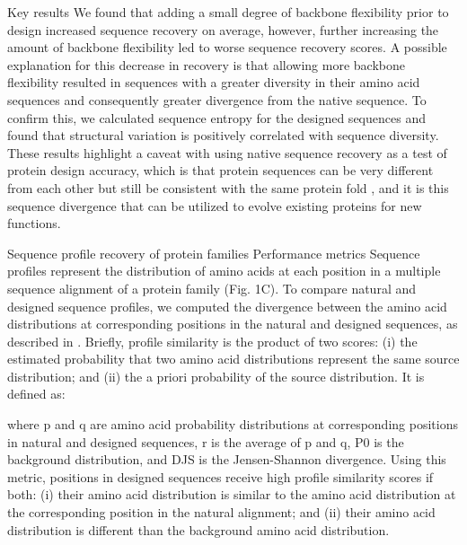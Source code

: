 Key results
We found that adding a small degree of backbone flexibility prior to design increased sequence recovery on average, however, further increasing the amount of backbone flexibility led to worse sequence recovery scores. A possible explanation for this decrease in recovery is that allowing more backbone flexibility resulted in sequences with a greater diversity in their amino acid sequences and consequently greater divergence from the native sequence. To confirm this, we calculated sequence entropy for the designed sequences and found that structural variation is positively correlated with sequence diversity. These results highlight a caveat with using native sequence recovery as a test of protein design accuracy, which is that protein sequences can be very different from each other but still be consistent with the same protein fold \cite{yona_within_2002}, and it is this sequence divergence that can be utilized to evolve existing proteins for new functions.

Sequence profile recovery of protein families
Performance metrics
Sequence profiles represent the distribution of amino acids at each position in a multiple sequence alignment of a protein family (Fig. 1C). To compare natural and designed sequence profiles, we computed the divergence between the amino acid distributions at corresponding positions in the natural and designed sequences, as described in \cite{yona_within_2002}. Briefly, profile similarity is the product of two scores: (i) the estimated probability that two amino acid distributions represent the same source distribution; and (ii) the a priori probability of the source distribution. It is defined as:



where p and q are amino acid probability distributions at corresponding positions in natural and designed sequences, r is the average of p and q, P0 is the background distribution, and DJS is the Jensen-Shannon divergence. Using this metric, positions in designed sequences receive high profile similarity scores if both: (i) their amino acid distribution is similar to the amino acid distribution at the corresponding position in the natural alignment; and (ii) their amino acid distribution is different than the background amino acid distribution.

